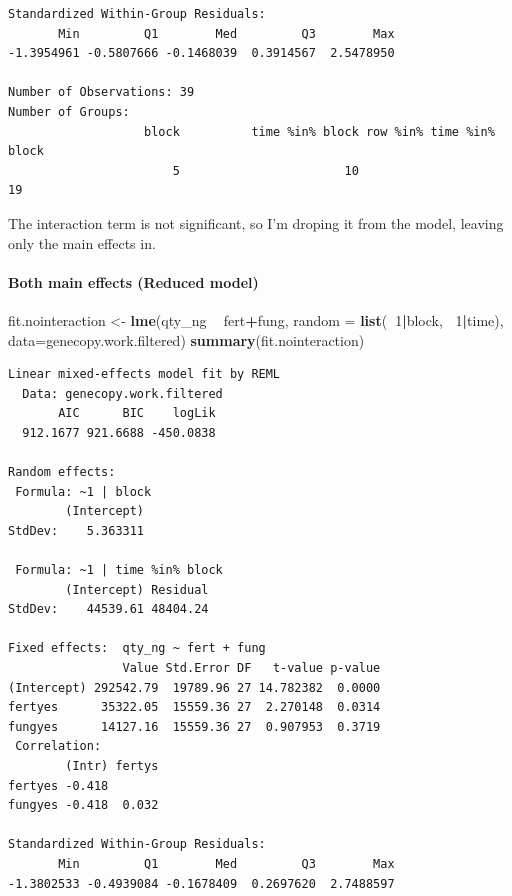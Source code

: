 \documentclass[twoside,12pt,final]{ucthesis-CA2012}
\newenvironment{Shaded}{}{}
\newcommand{\KeywordTok}[1]{\textcolor[rgb]{0.00,0.44,0.13}{\textbf{{#1}}}}
\newcommand{\DataTypeTok}[1]{\textcolor[rgb]{0.56,0.13,0.00}{{#1}}}
\newcommand{\DecValTok}[1]{\textcolor[rgb]{0.25,0.63,0.44}{{#1}}}
\newcommand{\StringTok}[1]{\textcolor[rgb]{0.25,0.44,0.63}{{#1}}}
\newcommand{\NormalTok}[1]{{#1}}
\newcommand{\OperatorTok}[1]{\textcolor[rgb]{0.00,0.44,0.13}{\textbf{{#1}}}}
\begin{document}
\begin{ucmainmatter}
\begin{verbatim}
Standardized Within-Group Residuals:
       Min         Q1        Med         Q3        Max 
-1.3954961 -0.5807666 -0.1468039  0.3914567  2.5478950 

Number of Observations: 39
Number of Groups: 
                   block          time %in% block row %in% time %in% block 
                       5                       10                       19 
\end{verbatim}
The interaction term is not significant, so I'm droping it from the model, leaving only the main effects in.

\hypertarget{both-main-effects-reduced-model}{%
\paragraph{Both main effects (Reduced model)}\label{both-main-effects-reduced-model}}
\begin{Shaded}
\begin{Highlighting}[]
\NormalTok{  fit.nointeraction <-}\StringTok{ }\KeywordTok{lme}\NormalTok{(qty_ng }\OperatorTok{~}\StringTok{ }\NormalTok{fert}\OperatorTok{+}\NormalTok{fung,}
                  \DataTypeTok{random =} \KeywordTok{list}\NormalTok{(}\OperatorTok{~}\DecValTok{1}\OperatorTok{|}\NormalTok{block, }\OperatorTok{~}\DecValTok{1}\OperatorTok{|}\NormalTok{time),}
                  \DataTypeTok{data=}\NormalTok{genecopy.work.filtered)}
  \KeywordTok{summary}\NormalTok{(fit.nointeraction)}
\end{Highlighting}
\end{Shaded}
\begin{verbatim}
Linear mixed-effects model fit by REML
  Data: genecopy.work.filtered 
       AIC      BIC    logLik
  912.1677 921.6688 -450.0838

Random effects:
 Formula: ~1 | block
        (Intercept)
StdDev:    5.363311

 Formula: ~1 | time %in% block
        (Intercept) Residual
StdDev:    44539.61 48404.24

Fixed effects:  qty_ng ~ fert + fung 
                Value Std.Error DF   t-value p-value
(Intercept) 292542.79  19789.96 27 14.782382  0.0000
fertyes      35322.05  15559.36 27  2.270148  0.0314
fungyes      14127.16  15559.36 27  0.907953  0.3719
 Correlation: 
        (Intr) fertys
fertyes -0.418       
fungyes -0.418  0.032

Standardized Within-Group Residuals:
       Min         Q1        Med         Q3        Max 
-1.3802533 -0.4939084 -0.1678409  0.2697620  2.7488597 


\end{verbatim}
\end{ucmainmatter}
\end{document}

